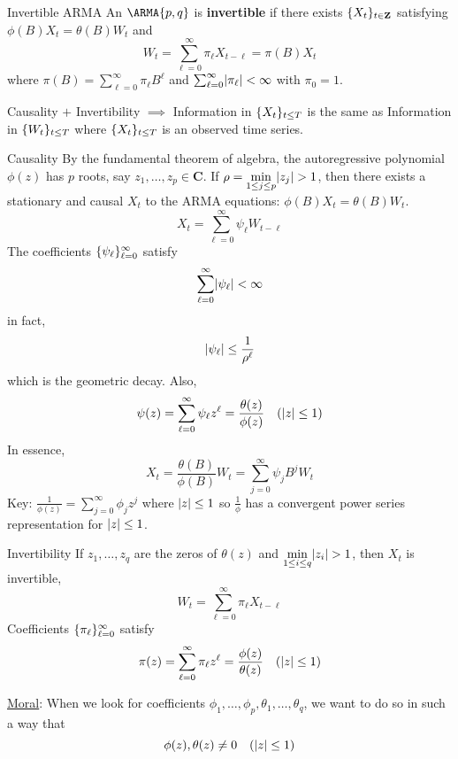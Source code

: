\begin{Definition}{Invertible ARMA}{}
    An $ \ARMA{p,q} $ is \textbf{invertible} if there exists $ \{X_t\}_{t\in\mathbf{Z}} $ satisfying
    $ \phi(B)X_t=\theta(B)W_t $ and
    \[ W_t=\sum_{\ell=0}^{\infty} \pi_\ell X_{t-\ell}=\pi(B)X_t \]
    where $ \pi(B)=\sum_{\ell=0}^{\infty} \pi_\ell B^\ell $
    and $ \sum_{\ell=0}^{\infty} \lvert\pi_\ell\rvert<\infty $ with
    $ \pi_0=1 $.
\end{Definition}
\begin{Remark}{}{}
    Causality $ + $ Invertibility $ \implies  $ Information
    in $ \{X_t\}_{t\le T} $ is the same as Information in
    $ \{W_t\}_{t\le T} $ where $ \{X_t\}_{t\le T} $ is
    an observed time series.
\end{Remark}
\begin{Theorem}{Causality}{}
    By the fundamental theorem of algebra, the autoregressive
    polynomial $ \phi(z) $ has $ p $ roots,
    say $ z_1,\ldots,z_p\in\mathbf{C} $. If
    $ \displaystyle  \rho=\min_{1\le j\le p}\lvert z_j\rvert>1 $,
    then there exists a stationary and causal $ X_t $
    to the ARMA equations: $ \phi(B)X_t=\theta(B)W_t $.
    \[ X_t=\sum_{\ell=0}^{\infty} \psi_\ell W_{t-\ell} \]
    The coefficients $ \{\psi_\ell\}_{\ell=0}^\infty $
    satisfy
    \[ \sum_{\ell=0}^{\infty} \lvert\psi_\ell\rvert<\infty \]
    in fact,
    \[ \lvert\psi_\ell\rvert\le \frac{1}{\rho^\ell}  \]
    which is the geometric decay. Also,
    \[ \psi(z)=\sum_{\ell=0}^{\infty}\psi_\ell z^\ell=\frac{\theta(z)}{\phi(z)}
        \quad(\lvert z\rvert\le 1)  \]
    In essence,
    \[ X_t=\frac{\theta(B)}{\phi(B)}W_t=\sum_{j=0}^{\infty} \psi_j B^j W_t  \]
    Key: $ \displaystyle \frac{1}{\phi(z)}=\sum_{j=0}^{\infty}
        \phi_j z^j $ where $ \lvert z\rvert\le 1 $ so $ \displaystyle \frac{1}{\phi} $ has a convergent power
    series representation for $ \lvert z\rvert\le 1 $.
\end{Theorem}
\begin{Theorem}{Invertibility}{}
    If $ z_1,\ldots,z_q $ are the zeros
    of $ \theta(z) $ and $ \displaystyle \min_{1\le i\le q}\lvert z_i\rvert>1 $,
    then $ X_t $ is invertible,
    \[ W_t=\sum_{\ell=0}^{\infty} \pi_\ell X_{t-\ell} \]
    Coefficients $ \{\pi_\ell\}_{\ell=0}^\infty $ satisfy
    \[ \pi(z)=\sum_{\ell=0}^{\infty} \pi_\ell z^\ell =\frac{\phi(z)}{\theta(z)}
        \quad (\lvert z\rvert\le 1)  \]
\end{Theorem}
\underline{Moral}: When we look for coefficients
$ \phi_1,\ldots,\phi_p,\theta_1,\ldots,\theta_q $,
we want to do so in such a way that
\[ \phi(z),\theta(z)\ne 0\quad(\lvert z\rvert\le 1) \]
